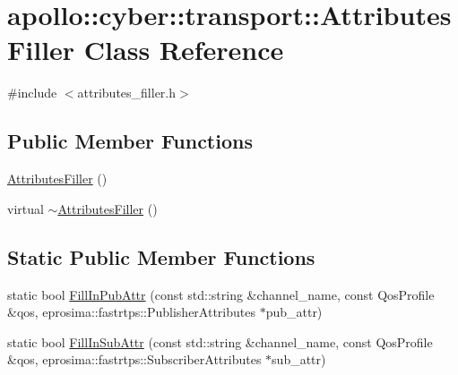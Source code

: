 \hypertarget{classapollo_1_1cyber_1_1transport_1_1AttributesFiller}{\section{apollo\-:\-:cyber\-:\-:transport\-:\-:Attributes\-Filler Class Reference}
\label{classapollo_1_1cyber_1_1transport_1_1AttributesFiller}
}


{\ttfamily \#include $<$attributes\-\_\-filler.\-h$>$}

\subsection*{Public Member Functions}
\begin{DoxyCompactItemize}
\item 
\hyperlink{classapollo_1_1cyber_1_1transport_1_1AttributesFiller_a6983e5484017410d54d050c13ef014c8}{Attributes\-Filler} ()
\item 
virtual \hyperlink{classapollo_1_1cyber_1_1transport_1_1AttributesFiller_a3719bb94df1e9893a83f46a27e9a9b04}{$\sim$\-Attributes\-Filler} ()
\end{DoxyCompactItemize}
\subsection*{Static Public Member Functions}
\begin{DoxyCompactItemize}
\item 
static bool \hyperlink{classapollo_1_1cyber_1_1transport_1_1AttributesFiller_aa19197b63feea199a1625819909977ae}{Fill\-In\-Pub\-Attr} (const std\-::string \&channel\-\_\-name, const Qos\-Profile \&qos, eprosima\-::fastrtps\-::\-Publisher\-Attributes $\ast$pub\-\_\-attr)
\item 
static bool \hyperlink{classapollo_1_1cyber_1_1transport_1_1AttributesFiller_ae4b39f7692486ce7e911ec440ee21eea}{Fill\-In\-Sub\-Attr} (const std\-::string \&channel\-\_\-name, const Qos\-Profile \&qos, eprosima\-::fastrtps\-::\-Subscriber\-Attributes $\ast$sub\-\_\-attr)
\end{DoxyCompactItemize}


